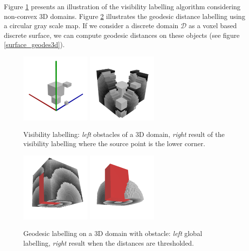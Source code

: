 \documentclass[fleqn,twoside]{article}
\begin{document}
Figure \ref{vis3d} presents an illustration of the visibility
labelling algorithm considering non-convex 3D domains. Figure
\ref{geodes3d} illustrates the geodesic distance labelling using a
circular gray scale map. If we consider a discrete domain $\mathcal{D}$ as a voxel based discrete surface, 
we can compute geodesic distances on these objects (see figure
\ref{surface_geodes3d}).

\begin{figure}[htb]
  \begin{center}
    \includegraphics[width=3.5cm]{cone_obs}
    \includegraphics[width=3.5cm]{cone}
    \caption{Visibility labelling: {\it left} obstacles of a 3D
      domain, {\it right} result of the visibility labelling  where
      the source point is the lower corner.}
  \label{vis3d}
\end{center}
\end{figure}

\begin{figure}[htb]
  \begin{center}
    \includegraphics[width=3.5cm]{obstacle}
    \includegraphics[width=3.5cm]{obstacle_onde}
    \caption{Geodesic labelling on a 3D domain with obstacle: {\it left}
    global labelling, {\it right} result when the distances are thresholded.}
  \label{geodes3d}
\end{center}
\end{figure}
\end{document}
